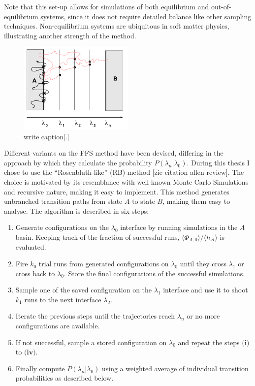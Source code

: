 Note that this set-up allows for simulations of both equilibrium and out-of-equilibrium
systems, since it does not require detailed balance like other sampling techniques.
Non-equilibrium systems are ubiquitous in soft matter physics, illustrating another
strength of the method.
\begin{figure}[ht]
\begin{center}
  \includegraphics[width=0.5\textwidth]{Figures/FFS.png}
  \caption{write caption[.]}
\end{center}
\end{figure}
Different variants on the FFS method have been devised, differing in the approach by
which they calculate the probability $P(\lambda_n|\lambda_0)$. During this thesis I
chose to use the “Rosenbluth-like” (RB) method [zie citation allen review]. The choice
is motivated
by its resemblance with well known Monte Carlo Simulations and recursive nature, making
it easy to implement.  This method generates unbranched transition paths from state $A$
to state $B$, making them easy to analyse. The algorithm is described in six steps:
\begin{enumerate}[label=\textbf{(\roman*)}]
   \item Generate configurations on the $\lambda_0$ interface by running
      simulations in the $A$ basin. Keeping track of the fraction of successful runs,
      $\langle\Phi_{A,0} \rangle/\langle h_{\mathcal{A}}\rangle$ is evaluated.
   \item Fire $k_0$ trial runs from generated configurations on $\lambda_0$ until they
      cross $\lambda_1$ or cross back to $\lambda_0$. Store the final configurations of
      the successful simulations.
   \item Sample one of the saved configuration on the $\lambda_1$ interface and use it to
      shoot $k_1$ runs to the next interface $\lambda_2$.
   \item Iterate the previous steps until the trajectories reach $\lambda_n$ or no more
     configurations are available.
   \item If not successful, sample a stored configuration on $\lambda_0$ and repeat the
      steps $\textbf{(i)}$ to $\textbf{(iv)}$.
   \item Finally compute $P(\lambda_n|\lambda_0)$ using a weighted average of individual
     transition probabilities as described below.
\end{enumerate}
